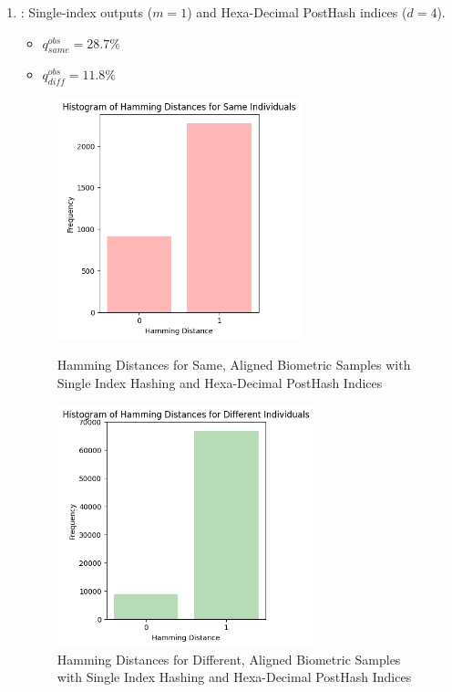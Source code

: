 \begin{enumerate}
    \item {}: Single-index outputs (\(m=1\)) and Hexa-Decimal PostHash indices (\(d=4\)).
    \begin{itemize}
        \item \(q_{same}^{obs} = 28.7\%\)
        \item \(q_{diff}^{obs} = 11.8\%\)
    \end{itemize}

    \begin{figure}[H]
        \centering
        \begin{minipage}[b]{0.48\linewidth}
            \centering
            \includegraphics[width=\linewidth,height=7cm,keepaspectratio]{latex-img/d4same.png}
            \caption{Hamming Distances for Same, Aligned Biometric Samples with Single Index Hashing and Hexa-Decimal PostHash Indices}
            \label{mu_same}
        \end{minipage}
        \hfill
        \begin{minipage}[b]{0.48\linewidth}
            \centering
            \includegraphics[width=\linewidth,height=7cm,keepaspectratio]{latex-img/d4diff.png}
            \caption{Hamming Distances for Different, Aligned Biometric Samples with Single Index Hashing and Hexa-Decimal PostHash Indices}
            \label{mu_diff}
        \end{minipage}
    \end{figure}
\end{enumerate}

